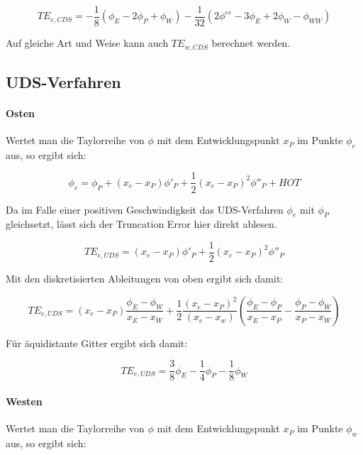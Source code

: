 \begin{equation*}
  TE_{e, CDS} = -\frac{1}{8} (\phi_E-2\phi_P+\phi_W) - \frac{1}{32}
  (2\phi^{ee} - 3\phi_E + 2\phi_W - \phi_{WW})
\end{equation*}

Auf gleiche Art und Weise kann auch $TE_{w, CDS}$ berechnet werden.

\subsection{UDS-Verfahren}

\paragraph{Osten}

Wertet man die Taylorreihe von $\phi$ mit dem Entwicklungspunkt $x_P$ im Punkte $\phi_e$
aus, so ergibt sich:

\begin{equation*}
  \phi_e = \phi_P +(x_e-x_P) \phi'_P + \frac{1}{2} (x_e-x_P)^2 \phi''_P+HOT
\end{equation*}

Da im Falle einer positiven Geschwindigkeit das UDS-Verfahren $\phi_e$ mit $\phi_P$
gleichsetzt, lässt sich der Truncation Error hier direkt ablesen.

\begin{equation*}
  TE_{e, UDS} = (x_e-x_P) \phi'_P + \frac{1}{2} (x_e-x_P)^2 \phi''_P
\end{equation*}

Mit den diskretisierten Ableitungen von oben ergibt sich damit:

\begin{equation}
  TE_{e, UDS} = (x_e-x_P) \frac{\phi_E-\phi_W}{x_E-x_W}+
  \frac{1}{2} \frac{(x_e-x_P)^2}{(x_e-x_w)} \left({\frac{\phi_E-\phi_P}{x_E-x_P}
  - \frac{\phi_P-\phi_W}{x_P-x_W} }\right)
\end{equation}

Für äquidistante Gitter ergibt sich damit:

\begin{equation}
  TE_{e, UDS} = \frac{3}{8} \phi_E-\frac{1}{4} \phi_P - \frac{1}{8} \phi_W
\end{equation}


\paragraph{Westen}

Wertet man die Taylorreihe von $\phi$ mit dem Entwicklungspunkt $x_P$ im Punkte $\phi_w$
aus, so ergibt sich:

